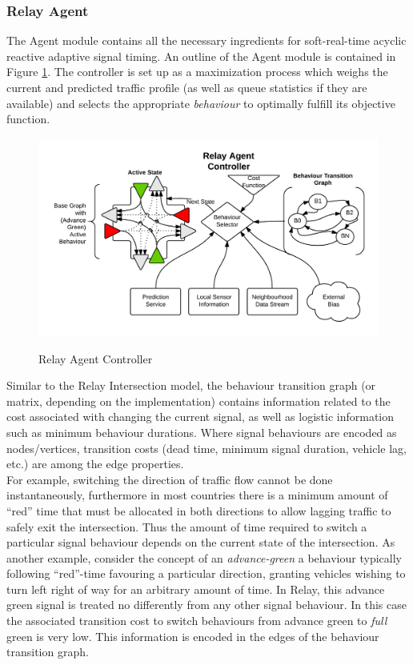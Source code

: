 \documentclass{report}
\begin{document}
\subsubsection{Relay Agent}
The Agent module contains all the necessary ingredients for soft-real-time acyclic reactive adaptive signal timing.
An outline of the Agent module is contained in Figure \ref{fig:Relay_Agent_Controller}.
The controller is set up as a maximization process which weighs the current and predicted traffic profile (as well as queue statistics if they are available) and selects the appropriate \emph{behaviour} to optimally fulfill its objective function.\\

\begin{figure}[H]
	\caption{Relay Agent Controller}
	\includegraphics[width=\textwidth]{figures/Relay_Agent_Controller.png}
	\label{fig:Relay_Agent_Controller}
\end{figure}

Similar to the Relay Intersection model, the behaviour transition graph (or matrix, depending on the implementation) contains information related to the cost associated with changing the current signal, as well as logistic information such as minimum behaviour durations.
Where signal behaviours are encoded as nodes/vertices, transition costs (dead time, minimum signal duration, vehicle lag, etc.) are among the edge properties. \\

For example, switching the direction of traffic flow cannot be done instantaneously, furthermore in most countries there is a minimum amount of ``red'' time that must be allocated in both directions to allow lagging traffic to safely exit the intersection.
Thus the amount of time required to switch a particular signal behaviour depends on the current state of the intersection.
As another example, consider the concept of an \emph{advance-green} a behaviour typically following ``red''-time favouring a particular direction, granting vehicles wishing to turn left right of way for an arbitrary amount of time.
In Relay, this advance green signal is treated no differently from any other signal behaviour.
In this case the associated transition cost to switch behaviours from advance green to \emph{full} green is very low.
This information is encoded in the edges of the behaviour transition graph. \\
\end{document}
